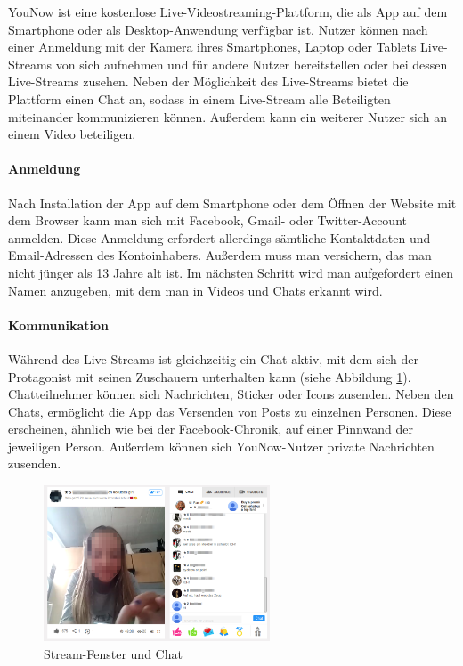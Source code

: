 YouNow ist eine kostenlose Live-Videostreaming-Plattform, die als App auf dem Smartphone oder als Desktop-Anwendung verfügbar ist. Nutzer können nach einer Anmeldung mit der Kamera ihres Smartphones, Laptop oder Tablets Live-Streams von sich aufnehmen und für andere Nutzer bereitstellen oder bei dessen Live-Streams zusehen. Neben der Möglichkeit des Live-Streams bietet die Plattform einen Chat an, sodass in einem Live-Stream alle Beteiligten miteinander kommunizieren können. Außerdem kann ein weiterer Nutzer sich an einem Video beteiligen. 

\paragraph{Anmeldung}
Nach Installation der App auf dem Smartphone oder dem Öffnen der Website mit dem Browser kann man sich mit Facebook, Gmail- oder Twitter-Account anmelden. Diese Anmeldung erfordert allerdings sämtliche Kontaktdaten und Email-Adressen des Kontoinhabers. Außerdem muss man versichern, das man nicht jünger als 13 Jahre alt ist.
Im nächsten Schritt wird man aufgefordert einen Namen anzugeben, mit dem man in Videos und Chats erkannt wird.

\paragraph{Kommunikation}
Während des Live-Streams ist gleichzeitig ein Chat aktiv, mit dem sich der Protagonist mit seinen Zuschauern unterhalten kann (siehe Abbildung \ref{stream_with_chat}). Chatteilnehmer können sich Nachrichten, Sticker oder Icons zusenden. Neben den Chats, ermöglicht die App das Versenden von Posts zu einzelnen Personen. Diese erscheinen, ähnlich wie bei der Facebook-Chronik, auf einer Pinnwand der jeweiligen Person. Außerdem können sich YouNow-Nutzer private Nachrichten zusenden.

\begin{figure}[h!]
\centering
\includegraphics[width=0.6\textwidth]{./resources/younow_stream_with_chat}
\caption{Stream-Fenster und Chat}
\label{stream_with_chat}
\end{figure} 

